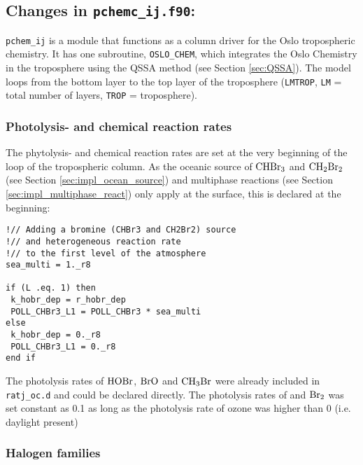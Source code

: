 


\subsection{Changes in \texttt{pchemc\_ij.f90}:}

\texttt{pchem\_ij} is a module that functions as a column driver for the Oslo tropospheric chemistry. It has one subroutine, \texttt{OSLO\_CHEM}, which integrates the Oslo Chemistry in the troposphere using the QSSA method (see Section \ref{sec:QSSA}). The model loops from the bottom layer to the top layer of the troposphere (\texttt{LMTROP}, \texttt{LM} = total number of layers, \texttt{TROP} = troposphere). 

\subsubsection{Photolysis- and chemical reaction rates}

The phytolysis- and chemical reaction rates are set at the very beginning of the loop of the tropospheric column. As the oceanic source of $\mathrm{CHBr_3}$ and $\mathrm{CH_2Br_2}$ (see Section \ref{sec:impl_ocean_source}) and multiphase reactions (see Section \ref{sec:impl_multiphase_react}) only apply at the surface, this is declared at the beginning:

\begin{lstlisting}
!// Adding a bromine (CHBr3 and CH2Br2) source 
!// and heterogeneous reaction rate 
!// to the first level of the atmosphere
sea_multi = 1._r8

if (L .eq. 1) then
 k_hobr_dep = r_hobr_dep
 POLL_CHBr3_L1 = POLL_CHBr3 * sea_multi
else
 k_hobr_dep = 0._r8
 POLL_CHBr3_L1 = 0._r8
end if
\end{lstlisting}


The photolysis rates of $\mathrm{HOBr}$, $\mathrm{BrO}$ and $\mathrm{CH_3Br}$ were already included in \texttt{ratj\_oc.d} and could be declared directly. The photolysis rates of  and $\mathrm{Br_2}$ was set constant as 0.1 as long as the photolysis rate of ozone was higher than 0 (i.e. daylight present)

\subsubsection{Halogen families}

